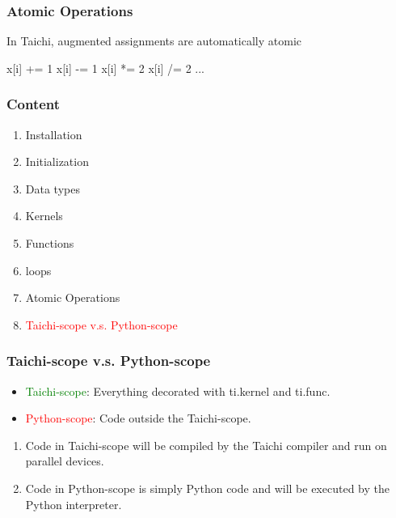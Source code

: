 \documentclass[serif,mathserif]{beamer}
\begin{document}
\begin{CJK}{UTF8}{gbsn}
\begin{frame}[fragile]
  \frametitle{Atomic Operations}
  In Taichi, augmented assignments are automatically atomic
  \begin{tcolorbox}
\begin{verbatim*}
x[i] += 1
x[i] -= 1
x[i] *= 2
x[i] /= 2
...
\end{verbatim*}
  \end{tcolorbox}

\end{frame}

\begin{frame}
  \frametitle{Content}
  \begin{enumerate}
  \item Installation
  \item Initialization
  \item Data types
  \item Kernels
  \item Functions
  \item loops
  \item Atomic Operations
  \item \textcolor{red}{Taichi-scope v.s. Python-scope}
  \end{enumerate}
\end{frame}

\begin{frame}
  \frametitle{Taichi-scope v.s. Python-scope}
  \begin{itemize}
  \item \textcolor{green}{Taichi-scope}: Everything decorated with ti.kernel and ti.func.\newline
  \item \textcolor{red}{Python-scope}: Code outside the Taichi-scope.\newline
  \end{itemize}
  \begin{enumerate}
  \item Code in Taichi-scope will be compiled by the Taichi compiler and run on parallel devices.\newline
  \item Code in Python-scope is simply Python code and will be executed by the Python interpreter.
  \end{enumerate}
\end{frame}

\end{CJK}
\end{document}

